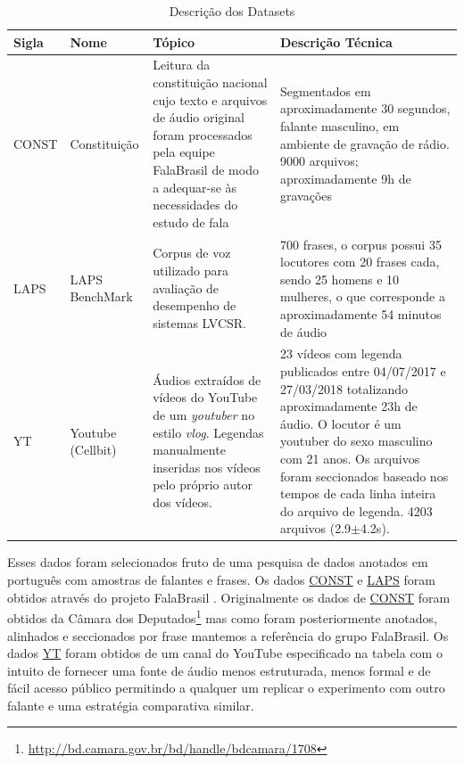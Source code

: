 \documentclass{article}
\begin{document}
\begin{center}
	\begin{table}[h!]
		\begin{tabular}{p{1cm}p{2cm}p{5cm}p{6cm}}
			\hline
			Sigla & Nome              & Tópico& Descrição Técnica\\ 
			\hline
			\hypertarget{CONST}{CONST} & Constituição      & Leitura da constituição nacional cujo texto e arquivos de áudio original foram processados pela equipe FalaBrasil de modo a adequar-se às necessidades do estudo de fala                          & Segmentados em aproximadamente 30 segundos, falante masculino, em ambiente de gravação de rádio. 9000 arquivos; aproximadamente 9h de gravações\\
			\hline
			\hypertarget{LAPS}{LAPS}  & LAPS BenchMark    & Corpus de voz utilizado para avaliação de desempenho de sistemas LVCSR.& 700 frases, o corpus possui 35 locutores com 20 frases cada, sendo 25 homens e 10 mulheres, o que corresponde a aproximadamente 54 minutos de áudio\\ 
			\hline
			\hypertarget{YT}{YT}    & Youtube (Cellbit) & Áudios extraídos de vídeos do YouTube de um \textit{youtuber} no estilo \textit{vlog}. Legendas manualmente inseridas nos vídeos pelo próprio autor dos vídeos. & 23 vídeos com legenda publicados entre 04/07/2017 e 27/03/2018 totalizando aproximadamente 23h de áudio. O locutor é um youtuber do sexo masculino com 21 anos. Os arquivos foram seccionados baseado nos tempos de cada linha inteira do arquivo de legenda. 4203 arquivos (2.9$\pm$4.2s). \\ 
			\hline
		\end{tabular}
		\caption{Descrição dos Datasets}
		\label{tab:datasets}
	\end{table}
\end{center}

Esses dados foram selecionados fruto de uma pesquisa de dados anotados em português com amostras de falantes e frases.
Os dados \hyperlink{CONST}{CONST} e \hyperlink{LAPS}{LAPS} foram obtidos através do projeto FalaBrasil \cite{falabrasil}.
Originalmente os dados de \hyperlink{CONST}{CONST} foram obtidos da Câmara dos Deputados\footnote{\url{http://bd.camara.gov.br/bd/handle/bdcamara/1708}} mas como foram posteriormente anotados, alinhados e seccionados por frase mantemos a referência do grupo FalaBrasil.
Os dados \hyperlink{YT}{YT} foram obtidos de um canal do YouTube especificado na tabela com o intuito de fornecer uma fonte de áudio menos estruturada, menos formal e de fácil acesso público permitindo a qualquer um replicar o experimento com outro falante e uma estratégia comparativa similar.
\end{document}

